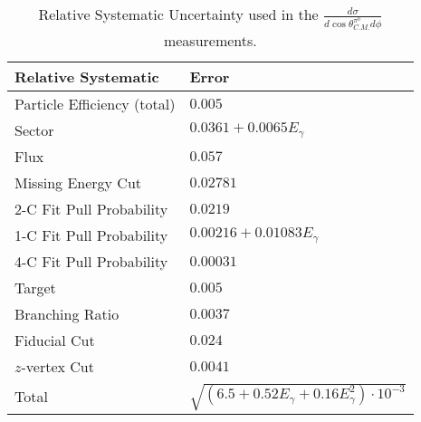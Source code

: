 \begin{table}[h!]
\begin{center}


\caption[Systematics]{\label{tab:systematics}Relative Systematic Uncertainty used in the $\frac{d\sigma}{d\cos\theta^{\pi^0}_{C.M.} d\phi}$ measurements. \vspace{0.75mm}}

\begin{tabular}{p{5.25cm} | p{5.35cm}}
\hline
Relative Systematic & Error \\
\hline
Particle Efficiency (total) & $0.005$ \\
Sector  & $ 0.0361 + 0.0065E_{\gamma}$ \\
Flux  & $ 0.057$ \\
Missing Energy Cut  & $0.02781$ \\
2-C Fit Pull Probability & $0.0219$ \\
1-C Fit Pull Probability  & $ 0.00216 + 0.01083E_{\gamma}$ \\
4-C Fit Pull Probability  & $0.00031$ \\ 
Target  & $0.005$ \\
Branching Ratio  & $0.0037$ \\
Fiducial Cut & $0.024$ \\
$z$-vertex Cut & $0.0041$ \\
Total & $\sqrt{(6.5 +0.52E_{\gamma} +0.16E_{\gamma}^2)\cdot10^{-3}}$ \\
\hline \hline
\end{tabular}


\end{center}
\end{table}
\vspace{20pt}